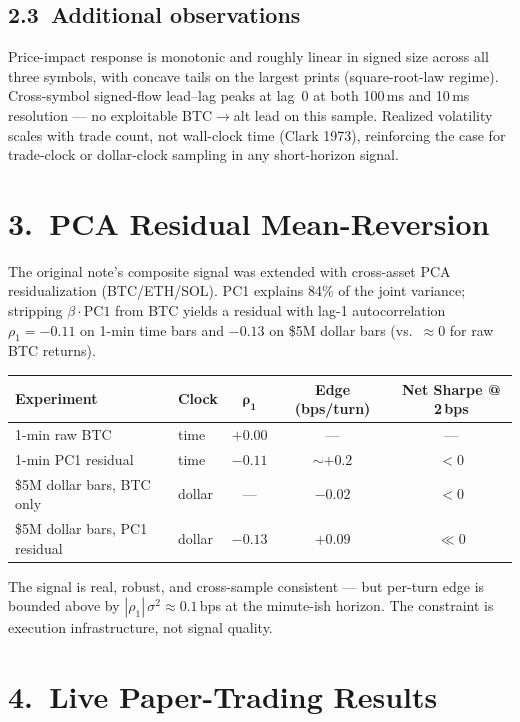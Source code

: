 \documentclass[10pt,a4paper]{article}
\begin{document}
\subsection*{2.3\ Additional observations}

Price-impact response is monotonic and roughly linear in signed size across
all three symbols, with concave tails on the largest prints (square-root-law
regime). Cross-symbol signed-flow lead--lag peaks at lag~0 at both 100\,ms and
10\,ms resolution --- no exploitable BTC$\to$alt lead on this sample. Realized
volatility scales with trade count, not wall-clock time (Clark 1973),
reinforcing the case for trade-clock or dollar-clock sampling in any
short-horizon signal.

\section*{3.\ PCA Residual Mean-Reversion}

The original note's composite signal was extended with cross-asset PCA
residualization (BTC/ETH/SOL). PC1 explains 84\% of the joint variance;
stripping $\beta \cdot \text{PC1}$ from BTC yields a residual with lag-1
autocorrelation $\rho_1 = -0.11$ on 1-min time bars and $-0.13$ on \$5M
dollar bars (vs.\ $\approx 0$ for raw BTC returns).

\medskip
\begin{tabular}{llccc}
\toprule
\textbf{Experiment} & \textbf{Clock} & $\boldsymbol{\rho_1}$ & \textbf{Edge (bps/turn)} & \textbf{Net Sharpe @ 2\,bps} \\
\midrule
1-min raw BTC           & time  & $+0.00$ & ---   & --- \\
1-min PC1 residual      & time  & $-0.11$ & $\sim +0.2$ & $< 0$ \\
\$5M dollar bars, BTC only & dollar & --- & $-0.02$ & $< 0$ \\
\$5M dollar bars, PC1 residual & dollar & $-0.13$ & $+0.09$ & $\ll 0$ \\
\bottomrule
\end{tabular}

\medskip\noindent
The signal is real, robust, and cross-sample consistent --- but per-turn edge
is bounded above by $|\rho_1|\,\sigma^2 \approx 0.1$\,bps at the minute-ish
horizon. The constraint is execution infrastructure, not signal quality.

\section*{4.\ Live Paper-Trading Results}
\end{document}
